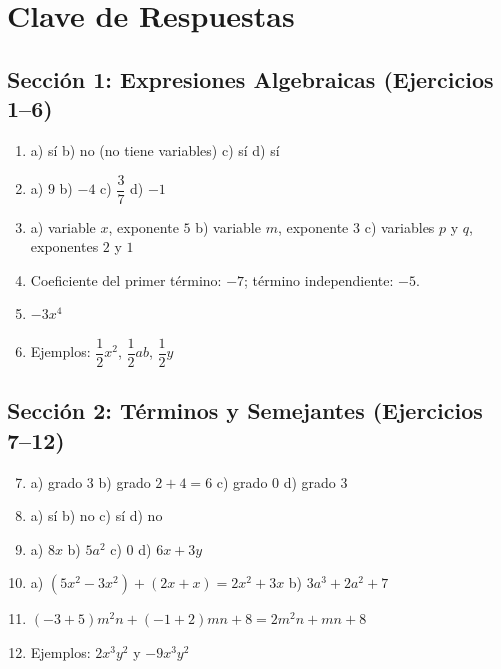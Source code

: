 \documentclass[12pt, letterpaper]{article}
\begin{document}
  \section{Clave de Respuestas}

  \subsection*{Sección 1: Expresiones Algebraicas (Ejercicios 1--6)}

  \begin{enumerate}[leftmargin=*, label=\textbf{\arabic*.}]
    \item a) sí \quad b) no (no tiene variables) \quad c) sí \quad d) sí

    \item a) $9$ \quad b) $-4$ \quad c) $\dfrac{3}{7}$ \quad d) $-1$

    \item a) variable $x$, exponente $5$ \quad b) variable $m$, exponente $3$ \quad c) variables $p$ y $q$, exponentes $2$ y $1$

    \item Coeficiente del primer término: $-7$; término independiente: $-5$.

    \item $-3x^4$

    \item Ejemplos: $\dfrac{1}{2}x^2$, $\dfrac{1}{2}ab$, $\dfrac{1}{2}y$
  \end{enumerate}

  \newpage

  \subsection*{Sección 2: Términos y Semejantes (Ejercicios 7--12)}

  \begin{enumerate}[leftmargin=*, label=\textbf{\arabic*.}]
    \setcounter{enumi}{6}
    \item a) grado $3$ \quad b) grado $2 + 4 = 6$ \quad c) grado $0$ \quad d) grado $3$

    \item a) sí \quad b) no \quad c) sí \quad d) no

    \item a) $8x$ \quad b) $5a^2$ \quad c) $0$ \quad d) $6x + 3y$

    \item a) $(5x^2 - 3x^2) + (2x + x) = 2x^2 + 3x$ \quad b) $3a^3 + 2a^2 + 7$

    \item $(-3 + 5)m^2n + (-1 + 2)mn + 8 = 2m^2n + mn + 8$

    \item Ejemplos: $2x^3y^2$ y $-9x^3y^2$
  \end{enumerate}
\end{document}
